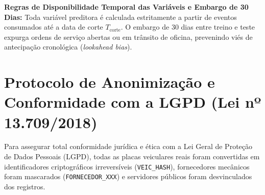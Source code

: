 \noindent\textbf{Regras de Disponibilidade Temporal das Variáveis e Embargo de 30 Dias:} Toda variável preditora é calculada estritamente a partir de eventos consumados até a data de corte $T_{\text{corte}}$. O embargo de 30 dias entre treino e teste expurga ordens de serviço abertas ou em trânsito de oficina, prevenindo viés de antecipação cronológica (\textit{lookahead bias}).

\section{Protocolo de Anonimização e Conformidade com a LGPD (Lei nº 13.709/2018)}

Para assegurar total conformidade jurídica e ética com a Lei Geral de Proteção de Dados Pessoais (LGPD), todas as placas veiculares reais foram convertidas em identificadores criptográficos irreversíveis (\texttt{VEIC\_HASH}), fornecedores mecânicos foram mascarados (\texttt{FORNECEDOR\_XXX}) e servidores públicos foram desvinculados dos registros.
